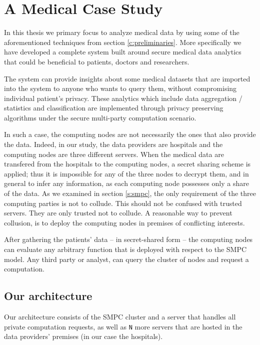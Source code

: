 \chapter{A Medical Case Study}\label{c:medical-study}

In this thesis we primary focus to analyze medical data by using some of the aforementioned techniques from section \ref{c:preliminaries}.
More specifically we have developed a complete system built around secure medical data analytics that could be beneficial to patients, doctors and researchers.

The system can provide insights about some medical datasets that are imported into the system to anyone who wants to query them, without compromising individual patient's privacy.
These analytics which include data aggregation / statistics and classification are implemented through privacy preserving algorithms under the secure multi-party computation scenario.

In such a case, the computing nodes are not necessarily the ones that also provide the data.
Indeed, in our study, the data providers are hospitals and the computing nodes are three different servers.
When the medical data are transfered from the hospitals to the computing nodes, a secret sharing scheme is applied; thus it is impossible for any of the three nodes to decrypt them, and in general to infer any information, as each computing node possesses only a share of the data.
As we examined in section \ref{s:smpc}, the only requirement of the three computing parties is not to collude.
This should not be confused with trusted servers.
They are only trusted not to collude.
A reasonable way to prevent collusion, is to deploy the computing nodes in premises of conflicting interests.


After gathering the patients' data -- in secret-shared form -- the computing nodes can evaluate any arbitrary function that is deployed with respect to the SMPC model.
Any third party or analyst, can query the cluster of nodes and request a computation.


\section{Our architecture }\label{s:architecture}
Our architecture consists of the SMPC cluster and a server  that handles all private computation requests, as well as \texttt{N} more servers that are hosted in the data providers' premises (in our case the hospitals).


